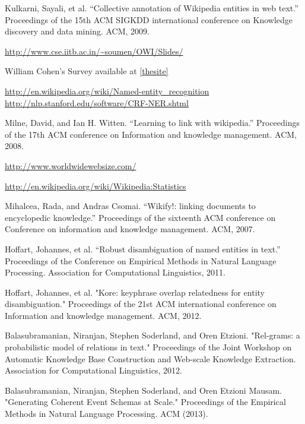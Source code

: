 \begin{thebibliography}{9}

 \label{thepaper} Kulkarni, Sayali, et al. ``Collective annotation of Wikipedia entities in web text.'' Proceedings of the 15th ACM SIGKDD international conference on Knowledge discovery and data mining. ACM, 2009.

  \label{thesite} \url{http://www.cse.iitb.ac.in/~soumen/OWI/Slides/}

 \label{thesurvey} William Cohen's Survey available at \ref{thesite}

 \label{thewiki} \url{http://en.wikipedia.org/wiki/Named-entity_recognition}
 \label{stanfordner} \url{http://nlp.stanford.edu/software/CRF-NER.shtml}


\label{mw}
Milne, David, and Ian H. Witten. ``Learning to link with wikipedia.'' Proceedings of the 17th ACM conference on Information and knowledge management. ACM, 2008.

 \label{ws} \url{http://www.worldwidewebsize.com/}

 \label{wikistats} \url{http://en.wikipedia.org/wiki/Wikipedia:Statistics}

 \label{wikify}
Mihalcea, Rada, and Andras Csomai. ``Wikify!: linking documents to encyclopedic knowledge.'' Proceedings of the sixteenth ACM conference on Conference on information and knowledge management. ACM, 2007.

 \label{aida}
Hoffart, Johannes, et al. ``Robust disambiguation of named entities in text.'' Proceedings of the Conference on Empirical Methods in Natural Language Processing. Association for Computational Linguistics, 2011.

 \label{kpsim}
Hoffart, Johannes, et al. "Kore: keyphrase overlap relatedness for entity disambiguation." Proceedings of the 21st ACM international conference on Information and knowledge management. ACM, 2012.

 \label{relgram}
Balasubramanian, Niranjan, Stephen Soderland, and Oren Etzioni. "Rel-grams: a probabilistic model of relations in text." Proceedings of the Joint Workshop on Automatic Knowledge Base Construction and Web-scale Knowledge Extraction. Association for Computational Linguistics, 2012.

 \label{cohschemas}
Balasubramanian, Niranjan, Stephen Soderland, and Oren Etzioni Mausam. "Generating Coherent Event Schemas at Scale." Proceedings of the Empirical Methods in Natural Language Processing. ACM (2013).


\end{thebibliography}
